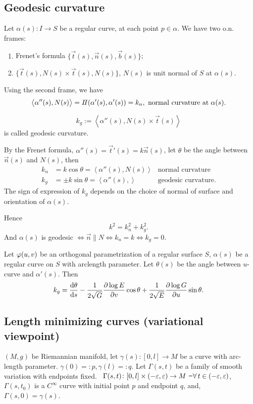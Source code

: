 \subsection{Geodesic curvature}
Let \(\alpha(s)\colon I\to S\) be a regular curve, at each point \(p\in \alpha\).
We have two o.n. frames:
\begin{enumerate}[(1)]
    \item Frenet's formula \(\{\vec{t}(s),\vec{n}(s),\vec{b}(s)\}\);
    \item \(\{\vec t(s),N(s)\times \vec t(s),N(s)\}\), \(N(s)\) is unit normal of
        \(S\) at \(\alpha(s)\).
\end{enumerate}
Using the second frame, we have \[
    \left<\alpha''(s),N(s)\right> =I\!I(\alpha'(s),\alpha'(s))=k_n,
    \text{ normal curvature at }\alpha(s)
.\] 

\begin{definition}
    \[
        k_g:=\left<\alpha''(s),N(s)\times \vec t(s)\right> 
    \] is called geodesic curvature.
\end{definition}

By the Frenet formula, \(\alpha''(s)=\vec t'(s)=k\vec n(s)\), let \(\theta\) be the
angle between \(\vec n(s)\) and \(N(s)\), then
\begin{align}
    k_n&= k\cos\theta=\left<\alpha''(s),N(s)\right> &\text{normal curvature} \\
    k_g&= \pm k\sin\theta=\left<\alpha''(s),\right> &\text{geodesic curvature}
.\end{align}
The sign of expression of \(k_g\) depends on the choice of normal of surface
and orientation of \(\alpha(s)\).

Hence \[
    k^2=k_n^2+k_g^2
.\] And \(\alpha(s)\) is geodesic \(\iff \vec n\parallel N\iff k_n=k\iff k_g=0\).

\begin{exercise}
    Let \(\varphi(u,v)\) be an orthogonal parametrization of a regular surface \(S\),
    \(\alpha(s)\) be a regular curve on \(S\) with arclength parameter.
    Let \(\theta(s)\) be the angle between \(u\)-curve and \(\alpha'(s)\). Then \[
        k_g=\dv{\theta}{s}-\frac{1}{2\sqrt{G}}\pdv{\log E}{v}\cos\theta
        +\frac{1}{2\sqrt{E}}\pdv{\log G}{u}\sin\theta
    .\] 
\end{exercise}

\subsection{Length minimizing curves (variational viewpoint)}
\((M,g)\) be Riemannian manifold, let \(\gamma(s)\colon [0,l]\to M\) be a curve
with arc-length parameter. \(\gamma(0)=:p,\gamma(l)=:q\). Let \(\Gamma(s,t)\) be a
family of smooth variation with endpoints fixed.
\ie\ \(\Gamma(s,t)\colon [0,l]\times (-\varepsilon,\varepsilon)\to M\) \st\ \(\forall\,t\in (-\varepsilon,
\varepsilon)\), \(\Gamma(s,t_0)\) is a \(C^\infty\) curve with initial point \(p\) and
endpoint \(q\), and, \(\Gamma(s,0)=\gamma(s)\).

